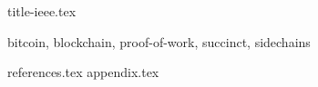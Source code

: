 \documentclass[conference,10pt,final,compsoc,letterpaper]{IEEEtran}
\begin{document}
{title-ieee.tex}

\begin{abstract}

\end{abstract}

\begin{IEEEkeywords}
bitcoin, blockchain, proof-of-work, succinct, sidechains
\end{IEEEkeywords}


{references.tex}
\appendix
{appendix.tex}
\end{document}
